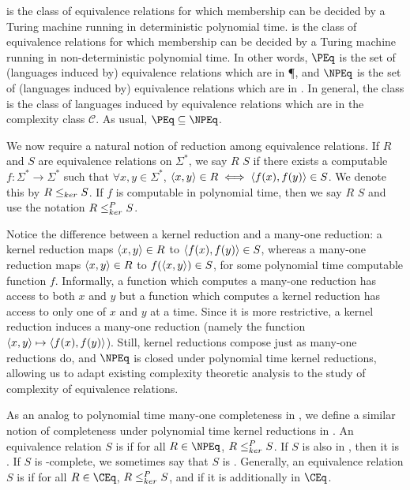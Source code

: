  is the class of equivalence relations for which membership can be decided by a Turing machine running in deterministic polynomial time.
 is the class of equivalence relations for which membership can be decided by a Turing machine running in non-deterministic polynomial time.
In other words, $\PEq$ is the set of (languages induced by) equivalence relations which are in \P, and $\NPEq$ is the set of (languages induced by) equivalence relations which are in \NP.
In general, the class  is the class of languages induced by equivalence relations which are in the complexity class $\mathcal{C}$.
As usual, $\PEq\subseteq\NPEq$.

We now require a natural notion of reduction among equivalence relations.
If $R$ and $S$ are equivalence relations on $\Sigma^*$, we say $R$  $S$ if there exists a computable $f\colon\Sigma^*\to\Sigma^*$ such that $\forall x,y\in\Sigma^*$, $\left\langle x,y\right\rangle\in R\iff \left\langle f(x),f(y)\right\rangle\in S$.
We denote this by $R\leq_{ker} S$.
If $f$ is computable in polynomial time, then we say $R$  $S$ and use the notation $R\leq^{P}_{ker} S$.

Notice the difference between a kernel reduction and a many-one reduction: a kernel reduction maps $\left\langle x,y\right\rangle\in R$ to $\left\langle f(x),f(y)\right\rangle\in S$, whereas a many-one reduction maps $\left\langle x,y\right\rangle\in R$ to $f(\left\langle x,y\right\rangle)\in S$, for some polynomial time computable function $f$.
Informally, a function which computes a many-one reduction has access to both $x$ and $y$ but a function which computes a kernel reduction has access to only one of $x$ and $y$ at a time.
Since it is more restrictive, a kernel reduction induces a many-one reduction (namely the function $\left\langle x,y\right\rangle \mapsto \left\langle f(x),f(y)\right\rangle$).
Still, kernel reductions compose just as many-one reductions do, and $\NPEq$ is closed under polynomial time kernel reductions, allowing us to adapt existing complexity theoretic analysis to the study of complexity of equivalence relations.

As an analog to polynomial time many-one completeness in \NP, we define a similar notion of completeness under polynomial time kernel reductions in \NPEq.
An equivalence relation $S$ is  if for all $R\in\NPEq$, $R\leq^{P}_{ker} S$.
If $S$ is also in \NPEq, then it is .
If $S$ is \NPEq-complete, we sometimes say that $S$ is .
Generally, an equivalence relation $S$ is  if for all $R\in\CEq$, $R\leq^{P}_{ker} S$, and  if it is additionally in $\CEq$.
